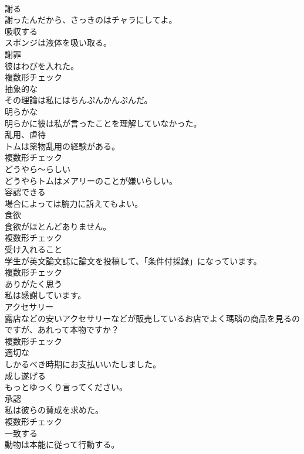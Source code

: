 \documentclass[8pt]{extreport}
\begin{document}
\begin{CJK}{UTF8}{min}
\\	[動詞]	謝る	
\\	謝ったんだから、さっきのはチャラにしてよ。	
\\	[動詞]	吸収する	
\\	スポンジは液体を吸い取る。	
\\	[名詞]	謝罪	
\\	彼はわびを入れた。	
\\	複数形チェック
\\	[形容詞]	抽象的な	
\\	その理論は私にはちんぷんかんぷんだ。	
\\	[形容詞]	明らかな	
\\	明らかに彼は私が言ったことを理解していなかった。	
\\	[名詞]	乱用、虐待	
\\	トムは薬物乱用の経験がある。	
\\	複数形チェック
\\	[副詞]	どうやら〜らしい	
\\	どうやらトムはメアリーのことが嫌いらしい。	
\\	[形容詞]	容認できる	
\\	場合によっては腕力に訴えてもよい。	
\\	[名詞]	食欲	
\\	食欲がほとんどありません。	
\\	複数形チェック
\\	[名詞]	受け入れること	
\\	学生が英文論文誌に論文を投稿して、「条件付採録」になっています。	
\\	複数形チェック
\\	[動詞]	ありがたく思う	
\\	私は感謝しています。	
\\	[名詞]	アクセサリー	
\\	露店などの安いアクセサリーなどが販売しているお店でよく瑪瑙の商品を見るのですが、あれって本物ですか？	
\\	複数形チェック
\\	[形容詞]	適切な	
\\	しかるべき時期にお支払いいたしました。	
\\	[動詞]	成し遂げる	
\\	もっとゆっくり言ってください。	
\\	[名詞]	承認	
\\	私は彼らの賛成を求めた。	
\\	複数形チェック
\\	[動詞]	一致する	
\\	動物は本能に従って行動する。	

\end{CJK}
\end{document}
